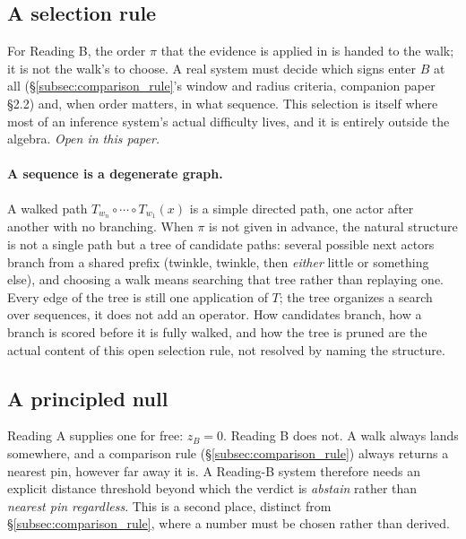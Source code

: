 \documentclass[12pt, a4paper]{article}
\begin{document}
\subsection{A selection rule}
\label{subsec:selection_rule}
For Reading B, the order $\pi$ that the evidence is applied in is
handed to the walk; it is not the walk's to choose. A real system must
decide which signs enter $B$ at all (\S\ref{subsec:comparison_rule}'s
window and radius criteria, companion paper \S2.2) and, when order
matters, in what sequence. This selection is itself where most of an
inference system's actual difficulty lives, and it is entirely outside
the algebra. \emph{Open in this paper.}

\paragraph{A sequence is a degenerate graph.} A walked path
$T_{w_n}\circ\cdots\circ T_{w_1}(x)$ is a simple directed path, one
actor after another with no branching. When $\pi$ is not given in
advance, the natural structure is not a single path but a tree of
candidate paths: several possible next actors branch from a shared
prefix (twinkle, twinkle, then \emph{either} little or something
else), and choosing a walk means searching that tree rather than
replaying one. Every edge of the tree is still one application of
$T$; the tree organizes a search over sequences, it does not add an
operator. How candidates branch, how a branch is scored before it is
fully walked, and how the tree is pruned are the actual content of
this open selection rule, not resolved by naming the structure.

\subsection{A principled null}
\label{subsec:the_null}
Reading A supplies one for free: $z_B=0$. Reading B does not. A walk
always lands somewhere, and a comparison rule (\S\ref{subsec:comparison_rule})
always returns a nearest pin, however far away it is. A Reading-B
system therefore needs an explicit distance threshold beyond which the
verdict is \emph{abstain} rather than \emph{nearest pin regardless}.
This is a second place, distinct from \S\ref{subsec:comparison_rule},
where a number must be chosen rather than derived.
\end{document}
